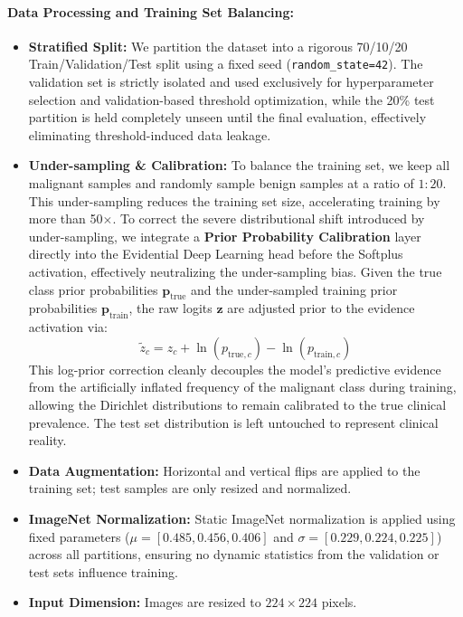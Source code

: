 \documentclass[letterpaper]{article} %
\begin{document}
\paragraph{Data Processing and Training Set Balancing:}
\begin{itemize}
    \item \textbf{Stratified Split:} We partition the dataset into a rigorous 70/10/20 Train/Validation/Test split using a fixed seed (\texttt{random\_state=42}). The validation set is strictly isolated and used exclusively for hyperparameter selection and validation-based threshold optimization, while the 20\% test partition is held completely unseen until the final evaluation, effectively eliminating threshold-induced data leakage.
    \item \textbf{Under-sampling \& Calibration:} To balance the training set, we keep all malignant samples and randomly sample benign samples at a ratio of $1:20$. This under-sampling reduces the training set size, accelerating training by more than 50$\times$. To correct the severe distributional shift introduced by under-sampling, we integrate a \textbf{Prior Probability Calibration} layer directly into the Evidential Deep Learning head before the Softplus activation, effectively neutralizing the under-sampling bias. Given the true class prior probabilities $\mathbf{p}_{\text{true}}$ and the under-sampled training prior probabilities $\mathbf{p}_{\text{train}}$, the raw logits $\mathbf{z}$ are adjusted prior to the evidence activation via:
    \begin{equation}
        \tilde{z}_c = z_c + \ln(p_{\text{true}, c}) - \ln(p_{\text{train}, c})
    \end{equation}
    This log-prior correction cleanly decouples the model's predictive evidence from the artificially inflated frequency of the malignant class during training, allowing the Dirichlet distributions to remain calibrated to the true clinical prevalence. The test set distribution is left untouched to represent clinical reality.
    \item \textbf{Data Augmentation:} Horizontal and vertical flips are applied to the training set; test samples are only resized and normalized.
    \item \textbf{ImageNet Normalization:} Static ImageNet normalization is applied using fixed parameters ($\mu = [0.485, 0.456, 0.406]$ and $\sigma = [0.229, 0.224, 0.225]$) across all partitions, ensuring no dynamic statistics from the validation or test sets influence training.
    \item \textbf{Input Dimension:} Images are resized to $224 \times 224$ pixels.
\end{itemize}
\end{document}
